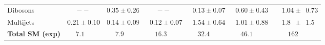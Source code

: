\begin{tabular}{lcccccc}
{Dibosons} & \multicolumn{1}{c}{${-} {-}$} & \multicolumn{1}{c}{$0.35 \pm 0.26$} & \multicolumn{1}{c}{${-} {-}$} & \multicolumn{1}{c}{$\phantom{3}0.13 \pm 0.07$} & \multicolumn{1}{c}{$\phantom{5}0.60 \pm 0.43$} & \multicolumn{1}{c}{$\phantom{17}1.04 \pm \phantom{2}0.73$}\\ 
{Multijets} & \multicolumn{1}{c}{$0.21 \pm 0.10$} & \multicolumn{1}{c}{$0.14 \pm 0.09$} & \multicolumn{1}{c}{$\phantom{1}0.12 \pm 0.07$} & \multicolumn{1}{c}{$\phantom{3}1.54 \pm 0.64$} & \multicolumn{1}{c}{$\phantom{5}1.01 \pm 0.88$} & \multicolumn{1}{c}{$\phantom{17}1.8\phantom{0} \pm \phantom{2}1.5\phantom{0}$}\\ \midrule 
{\textbf{Total SM (exp)}} & \multicolumn{1}{c}{$7.1\phantom{3}\phantom{3}$}  & \multicolumn{1}{c}{$7.9\phantom{3}\phantom{3}$}  & \multicolumn{1}{c}{$16.3\phantom{3}\phantom{3}$}  & \multicolumn{1}{c}{$32.4\phantom{3}\phantom{3}$}  & \multicolumn{1}{c}{$46.1\phantom{3}\phantom{3}$}  & \multicolumn{1}{c}{$162\phantom{3}\phantom{2}$} \\  
\bottomrule
\end{tabular}
